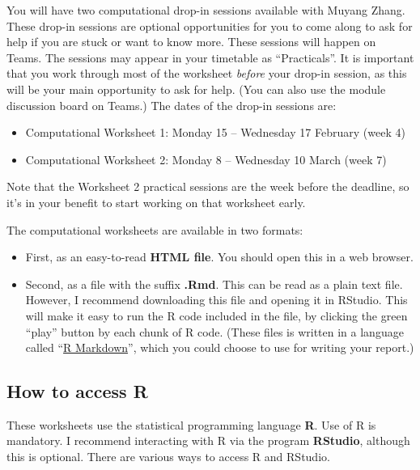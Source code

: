 \documentclass[
  a4paper,
]{article}
\providecommand{\tightlist}{%
  \setlength{\itemsep}{0pt}\setlength{\parskip}{0pt}}
\theoremstyle{definition}
\theoremstyle{definition}
\theoremstyle{definition}
\theoremstyle{remark}
\begin{document}
You will have two computational drop-in sessions available with Muyang Zhang. These drop-in sessions are optional opportunities for you to come along to ask for help if you are stuck or want to know more. These sessions will happen on Teams. The sessions may appear in your timetable as ``Practicals''. It is important that you work through most of the worksheet \emph{before} your drop-in session, as this will be your main opportunity to ask for help. (You can also use the module discussion board on Teams.) The dates of the drop-in sessions are:

\begin{itemize}
\tightlist
\item
  Computational Worksheet 1: Monday 15 -- Wednesday 17 February (week 4)
\item
  Computational Worksheet 2: Monday 8 -- Wednesday 10 March (week 7)
\end{itemize}

Note that the Worksheet 2 practical sessions are the week before the deadline, so it's in your benefit to start working on that worksheet early.

The computational worksheets are available in two formats:

\begin{itemize}
\tightlist
\item
  First, as an easy-to-read \textbf{HTML file}. You should open this in a web browser.
\item
  Second, as a file with the suffix \textbf{.Rmd}. This can be read as a plain text file. However, I recommend downloading this file and opening it in RStudio. This will make it easy to run the R code included in the file, by clicking the green ``play'' button by each chunk of R code. (These files is written in a language called ``\href{https://www.stat.cmu.edu/~cshalizi/rmarkdown/}{R Markdown}'', which you could choose to use for writing your report.)
\end{itemize}

\hypertarget{R-access}{%
\subsection*{How to access R}\label{R-access}}

These worksheets use the statistical programming language \textbf{R}. Use of R is mandatory. I recommend interacting with R via the program \textbf{RStudio}, although this is optional. There are various ways to access R and RStudio.
\end{document}
